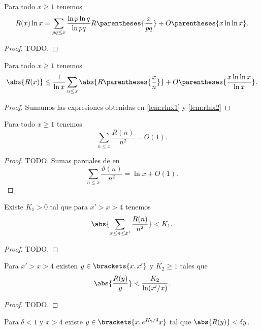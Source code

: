 \begin{lemma}
    \label{lem:rlnx2}
    Para todo \(x \geq 1\) tenemos
    \[
        R(x)\ln x
        = \sum_{pq \leq x} \frac{\ln p \ln q}{\ln pq}
        R\parentheses{\frac{x}{pq}} + O\parentheses{x \ln\ln x}.   
    \]
\end{lemma}

\begin{proof}
    TODO.
\end{proof}

\begin{lemma}
    Para todo \(x \geq 1\) tenemos
    \[
        \abs{R(x)}
        \leq \frac{1}{\ln x} \sum_{n \leq x} \abs{R\parentheses{\frac{x}{n}}}
        + O\parentheses{\frac{x\ln \ln x}{\ln x}}.
    \]
\end{lemma}

\begin{proof}
    Sumamos las expresiones obtenidas en \cref{lem:rlnx1} y \cref{lem:rlnx2}
\end{proof}

\begin{lemma}
    Para todo \(x \geq 1\) tenemos
    \[
        \sum_{n \leq x} \frac{R(n)}{n^2} = O(1).    
    \]
\end{lemma}

\begin{proof}
    TODO.
    Sumas parciales de \cite[teorema 2]{Mertens1874} en
    \[
        \sum_{n \leq x} \frac{\vartheta(n)}{n^2} = \ln x + O(1).
    \]
\end{proof}

\begin{lemma}
    Existe \(K_1 > 0\) tal que para \(x' > x > 4\) tenemos
    \[
        \abs{\sum_{x \leq n \leq x'} \frac{R(n)}{n^2}} < K_1.
    \]
\end{lemma}

\begin{proof}
    TODO.
\end{proof}

\begin{lemma}
    Para \(x' > x > 4\) existen \(y \in \brackets{x, x'}\)
    y \(K_2 \geq 1\) tales que
    \[
        \abs{\frac{R(y)}{y}} < \frac{K_2}{\ln(x'/x)}.
    \]
\end{lemma}

\begin{proof}
    TODO.
\end{proof}

\begin{lemma}
    Para \(\delta < 1\) y \(x > 4\) existe
    \(y \in \brackets{x, e^{K_2 / \delta} x}\) tal que
    \(\abs{R(y)} < \delta y\).
\end{lemma}


